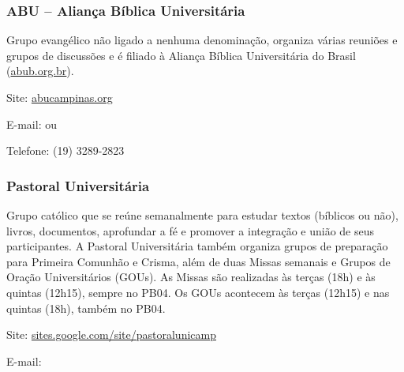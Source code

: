 \subsubsection*{ABU -- Aliança Bíblica Universitária}

Grupo evangélico não ligado a nenhuma denominação, organiza várias reuniões e
grupos de discussões e é filiado à Aliança Bíblica Universitária do Brasil
(\url{abub.org.br}).

\begin{compactitemize}
    \item Site: \url{abucampinas.org}
    \item E-mail:  ou
    \item Telefone: (19) 3289-2823
\end{compactitemize}

\subsubsection*{Pastoral Universitária}

Grupo católico que se reúne semanalmente para estudar textos (bíblicos ou não),
livros, documentos, aprofundar a fé e promover a integração e união de seus
participantes. A Pastoral Universitária também organiza grupos de preparação
para Primeira Comunhão e Crisma, além de duas Missas semanais e Grupos de Oração
Universitários (GOUs). As Missas são realizadas às terças (18h) e às quintas
(12h15), sempre no PB04. Os GOUs acontecem às terças (12h15) e nas quintas
(18h), também no PB04.

\begin{compactitemize}
    \item Site: \url{sites.google.com/site/pastoralunicamp}
    \item E-mail: 
\end{compactitemize}
